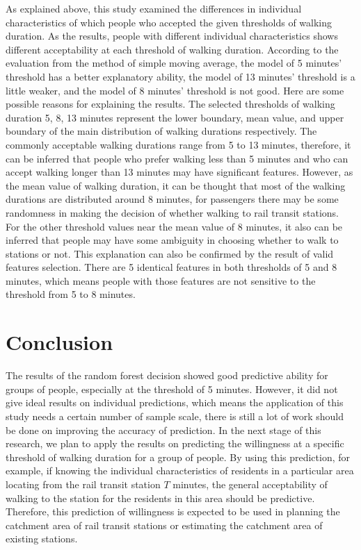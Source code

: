 %
As explained above, this study examined the differences in individual characteristics of which people who accepted the given thresholds of walking duration. As the results, people with different individual characteristics shows different acceptability at each threshold of walking duration. According to the evaluation from the method of simple moving average, the model of 5 minutes’ threshold has a better explanatory ability, the model of 13 minutes' threshold is a little weaker, and the model of 8 minutes' threshold is not good. Here are some possible reasons for explaining the results. The selected thresholds of walking duration 5, 8, 13 minutes represent the lower boundary, mean value, and upper boundary of the main distribution of walking durations respectively. The commonly acceptable walking durations range from 5 to 13 minutes, therefore, it can be inferred that people who prefer walking less than 5 minutes and who can accept walking longer than 13 minutes may have significant features. However, as the mean value of walking duration, it can be thought that most of the walking durations are distributed around 8 minutes, for passengers there may be some randomness in making the decision of whether walking to rail transit stations. For the other threshold values near the mean value of 8 minutes, it also can be inferred that people may have some ambiguity in choosing whether to walk to stations or not. This explanation can also be confirmed by the result of valid features selection. There are 5 identical features in both thresholds of 5 and 8 minutes, which means people with those features are not sensitive to the threshold from 5 to 8 minutes.

\section{Conclusion}
%
The results of the random forest decision showed good predictive ability for groups of people, especially at the threshold of 5 minutes. However, it did not give ideal results on individual predictions, which means the application of this study needs a certain number of sample scale, there is still a lot of work should be done on improving the accuracy of prediction. In the next stage of this research, we plan to apply the results on predicting the willingness at a specific threshold of walking duration for a group of people. By using this prediction, for example, if knowing the individual characteristics of residents in a particular area locating from the rail transit station $T$ minutes, the general acceptability of walking to the station for the residents in this area should be predictive. Therefore, this prediction of willingness is expected to be used in planning the catchment area of rail transit stations or estimating the catchment area of existing stations.

\clearpage %
% 

